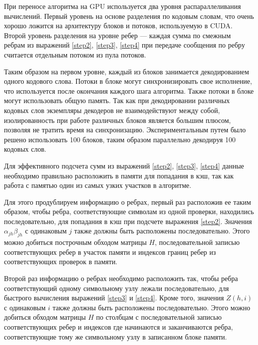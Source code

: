 При переносе алгоритма на GPU используется два уровня распараллеливания вычислений. Первый уровень на
основе разделения по кодовым словам, что очень хорошо ложится на архитектуру блоков и потоков, используемую
в CUDA. Второй уровень разделения на уровне ребер --- каждая сумма по смежным ребрам из выражений
\ref{step2}, \ref{step3}, \ref{step4} при передаче сообщения
по ребру считается отдельным потоком из пула потоков.

Таким образом на первом уровне, каждый из блоков занимается декодированием одного кодового слова.
Потоки в блоке могут синхронизировать свое исполнение, что используется после окончания каждого шага
алгоритма. Также потоки в блоке могут использовать общую память. Так как при декодировании различных
кодовых слов экземпляры декодеров не взаимодействуют между собой, изолированность при работе различных
блоков является большим плюсом, позволяя не тратить время на синхронизацию. Экспериментальным путем
было решено использовать 100 блоков, таким образом параллельно декодируя 100 кодовых слов.

Для эффективного подсчета сумм из выражений \ref{step2}, \ref{step3}, \ref{step4} данные необходимо
правильно расположить в памяти для попадания в кэш, так как работа с памятью один из самых узких 
участков в алгоритме. 

Для этого продублируем информацию о ребрах, первый раз расположив ее таким образом,
чтобы ребра, соответствующие символам из одной проверки, находились последовательно, для попадания в кэш
при подсчете выражения \ref{step2}. Значения $\alpha_{jh}\beta_{jh}$ с одинаковым $j$ также должны быть
расположены последовательно. Этого можно добиться построчным обходом матрицы $H$, последовательной записью
соответствующих ребер в участок памяти и индексов границ ребер из соответствующих проверок в памяти.

Второй раз информацию о ребрах необходимо расположить так, чтобы ребра соответствующий одному символьному
узлу лежали последовательно, для быстрого вычисления выражений \ref{step3} и \ref{step4}. Кроме того,
значения $Z(h,i)$ с одинаковым $i$ также должны быть расположены последовательно. Этого можно добиться
обходом матрицы $H$ по столбцам с последовательной записью соответствующих ребер и индексов где начинаются
и заканчиваются ребра, соответствующие тому же символьному узлу в записанном блоке памяти.

